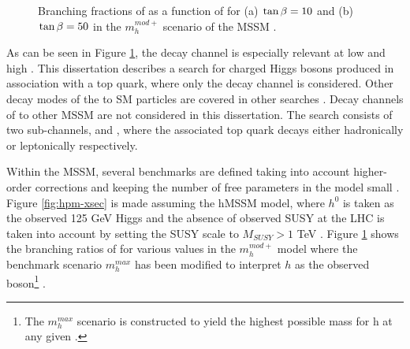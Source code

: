 	\begin{figure}[!ht]
		\centering
		\caption{\label{fig:hpm-br} Branching fractions of \Hpm as a function of \mHpm for (a) $\tan\beta = 10$ and (b) $\tan\beta = 50$ in the $m^{mod+}_{h}$ scenario of the \gls{MSSM} \cite{Higgs-Crosssections}. }
	\end{figure}
	As can be seen in Figure \ref{fig:hpm-br}, the \HpmLong decay channel is especially relevant at low \mHpm and high \tanb. This dissertation describes a search for charged Higgs bosons produced in association with a top quark, where only the \HpmLong decay channel is considered. Other decay modes of the \Hpm to \gls{SM} particles are covered in other searches \cites{MSSM-benchmarks}. Decay channels of \Hpm to other \gls{MSSM} are not considered in this dissertation. The search consists of two sub-channels, \taujets and \taulep, where the associated top quark decays either hadronically or leptonically respectively. 

	Within the \gls{MSSM}, several benchmarks are defined taking into account higher-order corrections and keeping the number of free parameters in the model small \cite{MSSM-benchmarks}. Figure \ref{fig:hpm-xsec} is made assuming the hMSSM model, where $h^0$ is taken as the observed 125 GeV Higgs and the absence of observed \gls{SUSY} at the LHC is taken into account by setting the \gls{SUSY} scale to $M_{SUSY}>1$ TeV \cite{hMSSM}. Figure \ref{fig:hpm-br} shows the branching ratios of \Hpm for various \tanb values in the $m^{mod+}_{h}$ model where the benchmark scenario $m^{max}_{h}$ has been modified to interpret $h$ as the observed boson\footnote{The $m^{max}_{h}$ scenario is constructed to yield the highest possible mass for h at any given \tanb.} \cite{MSSM-benchmarks}.

